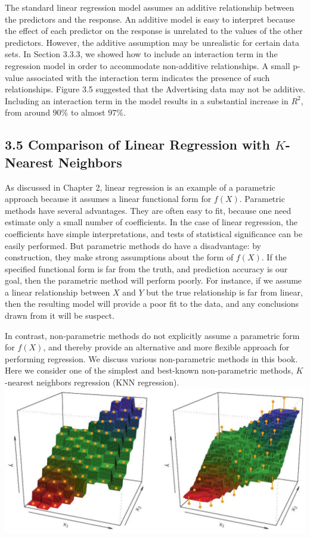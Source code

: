 \documentclass[10pt]{article}
\begin{document}
The standard linear regression model assumes an additive relationship between the predictors and the response. An additive model is easy to interpret because the effect of each predictor on the response is unrelated to the values of the other predictors. However, the additive assumption may be unrealistic for certain data sets. In Section 3.3.3, we showed how to include an interaction term in the regression model in order to accommodate non-additive relationships. A small p-value associated with the interaction term indicates the presence of such relationships. Figure 3.5 suggested that the Advertising data may not be additive. Including an interaction term in the model results in a substantial increase in $R^{2}$, from around $90 \%$ to almost $97 \%$.

\subsection*{3.5 Comparison of Linear Regression with $K$-Nearest Neighbors}
As discussed in Chapter 2, linear regression is an example of a parametric approach because it assumes a linear functional form for $f(X)$. Parametric methods have several advantages. They are often easy to fit, because one need estimate only a small number of coefficients. In the case of linear regression, the coefficients have simple interpretations, and tests of statistical significance can be easily performed. But parametric methods do have a disadvantage: by construction, they make strong assumptions about the form of $f(X)$. If the specified functional form is far from the truth, and prediction accuracy is our goal, then the parametric method will perform poorly. For instance, if we assume a linear relationship between $X$ and $Y$ but the true relationship is far from linear, then the resulting model will provide a poor fit to the data, and any conclusions drawn from it will be suspect.

In contrast, non-parametric methods do not explicitly assume a parametric form for $f(X)$, and thereby provide an alternative and more flexible approach for performing regression. We discuss various non-parametric methods in this book. Here we consider one of the simplest and best-known non-parametric methods, $K$-nearest neighbors regression (KNN regression).\\
\includegraphics[max width=\textwidth, center]{2025_05_05_efe77898333945044de4g-120}
\end{document}
